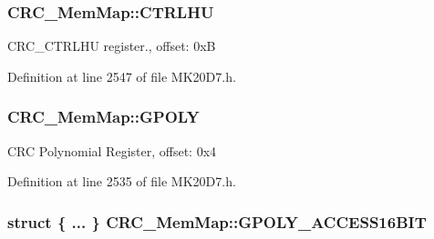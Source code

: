 \subsubsection[{\texorpdfstring{C\+T\+R\+L\+HU}{CTRLHU}}]{ C\+R\+C\+\_\+\+Mem\+Map\+::\+C\+T\+R\+L\+HU}\hypertarget{struct_c_r_c___mem_map_a30abe06fea900d839a8558bd48e0a3a0}{}\label{struct_c_r_c___mem_map_a30abe06fea900d839a8558bd48e0a3a0}
C\+R\+C\+\_\+\+C\+T\+R\+L\+HU register., offset\+: 0xB 

Definition at line 2547 of file M\+K20\+D7.\+h.

\subsubsection[{\texorpdfstring{G\+P\+O\+LY}{GPOLY}}]{ C\+R\+C\+\_\+\+Mem\+Map\+::\+G\+P\+O\+LY}\hypertarget{struct_c_r_c___mem_map_ab897251ee30cb234786a0f0a305f4620}{}\label{struct_c_r_c___mem_map_ab897251ee30cb234786a0f0a305f4620}
C\+RC Polynomial Register, offset\+: 0x4 

Definition at line 2535 of file M\+K20\+D7.\+h.

\subsubsection[{\texorpdfstring{G\+P\+O\+L\+Y\+\_\+\+A\+C\+C\+E\+S\+S16\+B\+IT}{GPOLY_ACCESS16BIT}}]{\setlength{\rightskip}{0pt plus 5cm}struct \{ ... \}   C\+R\+C\+\_\+\+Mem\+Map\+::\+G\+P\+O\+L\+Y\+\_\+\+A\+C\+C\+E\+S\+S16\+B\+IT}\hypertarget{struct_c_r_c___mem_map_a93fa298b251e36fd8b4f0dfe1a3449e2}{}\label{struct_c_r_c___mem_map_a93fa298b251e36fd8b4f0dfe1a3449e2}
